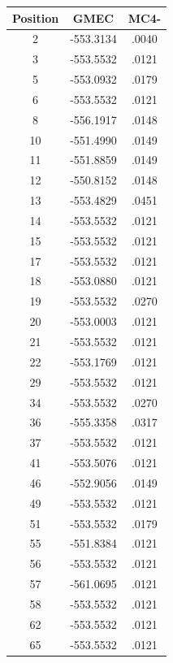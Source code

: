 \documentclass[a4paper,12pt]{article}
\begin{document}
    \begin{table}[h]
      \centering

      \begin{tabular}{|c|c|c|}


        \hline
        Position & GMEC & MC4- \\
        \hline
        2 & -553.3134 & .0040 \\
        3 & -553.5532 & .0121 \\
        5 & -553.0932 & .0179 \\
        6 & -553.5532 & .0121 \\
        8 & -556.1917 & .0148 \\
        10 & -551.4990 & .0149 \\
        11 & -551.8859 & .0149 \\
        12 & -550.8152 & .0148 \\
        13 & -553.4829 & .0451 \\
        14 & -553.5532 & .0121 \\
        15 & -553.5532 & .0121 \\
        17 & -553.5532 & .0121 \\
        18 & -553.0880 & .0121 \\
        19 & -553.5532 & .0270 \\
        20 & -553.0003 & .0121 \\
        21 & -553.5532 & .0121 \\
        22 & -553.1769 & .0121 \\
        29 & -553.5532 & .0121 \\
        34 & -553.5532 & .0270 \\
        36 & -555.3358 & .0317 \\
        37 & -553.5532 & .0121 \\
        41 & -553.5076 & .0121 \\
        46 & -552.9056 & .0149 \\
        49 & -553.5532 & .0121 \\
        51 & -553.5532 & .0179 \\
        55 & -551.8384 & .0121 \\
        56 & -553.5532 & .0121 \\
        57 & -561.0695 & .0121 \\
        58 & -553.5532 & .0121 \\
        62 & -553.5532 & .0121 \\
        65 & -553.5532 & .0121 \\

\end{tabular}
\end{table}
\end{document}
